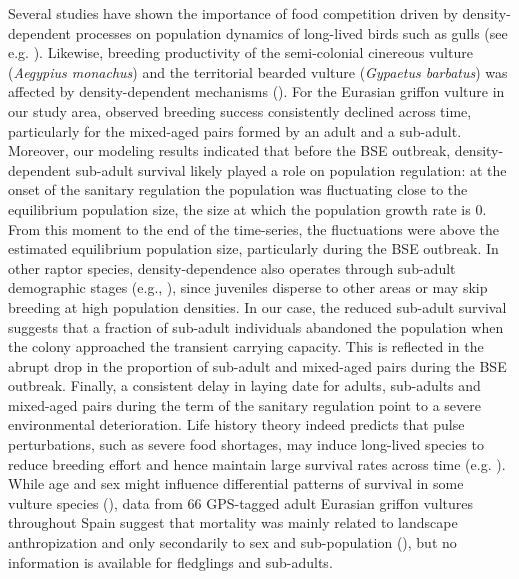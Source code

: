 \documentclass[12pt]{article}
\begin{document}
Several studies have shown the importance of food competition driven by density-dependent processes on population dynamics of long-lived birds such as gulls (see e.g. \cite{Payo-Payo2016}). Likewise, breeding productivity of the semi-colonial cinereous vulture (\textit{Aegypius monachus}) and the territorial bearded vulture (\textit{Gypaetus barbatus}) was affected by density-dependent mechanisms (\cite{Carrete2006,Fernandez-Bellon2016}). For the Eurasian griffon vulture in our study area, observed breeding success consistently declined across time, particularly for the mixed-aged pairs formed by an adult and a sub-adult. Moreover, our modeling results indicated that before the BSE outbreak, density-dependent sub-adult survival likely played a role on population regulation: at the onset of the sanitary regulation the population was fluctuating close to the equilibrium population size, the size at which the population growth rate is 0. From this moment to the end of the time-series, the fluctuations were above the estimated equilibrium population size, particularly during the BSE outbreak. In other raptor species, density-dependence also operates through sub-adult demographic stages (e.g., \cite{Carrete2006a}), since juveniles disperse to other areas or may skip breeding at high population densities. In our case, the reduced sub-adult survival suggests that a fraction of sub-adult individuals abandoned the population when the colony approached the transient carrying capacity. This is reflected in the abrupt drop in the proportion of sub-adult and mixed-aged pairs during the BSE outbreak. Finally, a consistent delay in laying date for adults, sub-adults and mixed-aged pairs during the term of the sanitary regulation point to a severe environmental deterioration. Life history theory indeed predicts that pulse perturbations, such as severe food shortages, may induce long-lived species to reduce breeding effort and hence maintain large survival rates across time (e.g. \cite{Saether2000}). While age and sex might influence differential patterns of survival in some vulture species (\cite{Sanz-Aguilar2017}), data from 66 GPS-tagged adult Eurasian griffon vultures throughout Spain suggest that mortality was mainly related to landscape anthropization and only secondarily to sex and sub-population (\cite{Arrondo2020}), but no information is available for fledglings and sub-adults. \\

\end{document}
